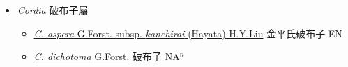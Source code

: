 
  \begin{itemize}
 \item[] \textit{Cordia} 破布子屬
                    
  \begin{itemize}
        \item[] \href{http://www.theplantlist.org/tpl1.1/search?q=Cordia+aspera+subsp.+kanehirai}{\textit{C. aspera} G.Forst. subsp. \textit{kanehirai} (Hayata) H.Y.Liu}   金平氏破布子 EN
        \item[] \href{http://www.theplantlist.org/tpl1.1/search?q=Cordia+dichotoma}{\textit{C. dichotoma} G.Forst.}   破布子 NA$^n$
  \end{itemize}
  \end{itemize}
